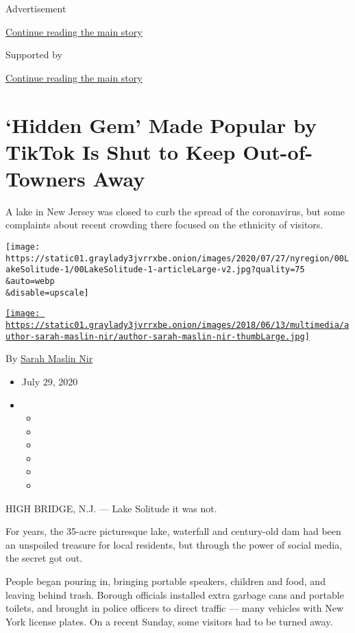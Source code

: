 Advertisement

\protect\hyperlink{after-top}{Continue reading the main story}

Supported by

\protect\hyperlink{after-sponsor}{Continue reading the main story}

\hypertarget{hidden-gem-made-popular-by-tiktok-is-shut-to-keep-out-of-towners-away}{%
\section{`Hidden Gem' Made Popular by TikTok Is Shut to Keep
Out-of-Towners
Away}\label{hidden-gem-made-popular-by-tiktok-is-shut-to-keep-out-of-towners-away}}

A lake in New Jersey was closed to curb the spread of the coronavirus,
but some complaints about recent crowding there focused on the ethnicity
of visitors.

\texttt{[image: https://static01.graylady3jvrrxbe.onion/images/2020/07/27/nyregion/00LakeSolitude-1/00LakeSolitude-1-articleLarge-v2.jpg?quality=75\\\&auto=webp\\\&disable=upscale]}

\href{https://www.nytimes3xbfgragh.onion/by/sarah-maslin-nir}{\texttt{[image: https://static01.graylady3jvrrxbe.onion/images/2018/06/13/multimedia/author-sarah-maslin-nir/author-sarah-maslin-nir-thumbLarge.jpg]}}

By \href{https://www.nytimes3xbfgragh.onion/by/sarah-maslin-nir}{Sarah
Maslin Nir}

\begin{itemize}
\item
  July 29, 2020
\item
  \begin{itemize}
  \item
  \item
  \item
  \item
  \item
  \item
  \end{itemize}
\end{itemize}

HIGH BRIDGE, N.J. --- Lake Solitude it was not.

For years, the 35-acre picturesque lake, waterfall and century-old dam
had been an unspoiled treasure for local residents, but through the
power of social media, the secret got out.

People began pouring in, bringing portable speakers, children and food,
and leaving behind trash. Borough officials installed extra garbage cans
and portable toilets, and brought in police officers to direct traffic
--- many vehicles with New York license plates. On a recent Sunday, some
visitors had to be turned away.

